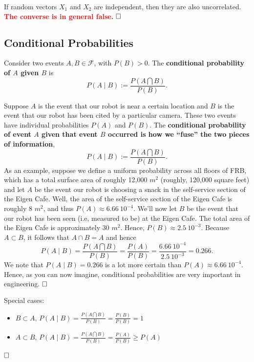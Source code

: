 \begin{fact} If random vectors $X_1$ and $X_2$ are independent, then they are also uncorrelated. \textcolor{red}{\bf The converse is in general false.}
$\hfill \square$
\end{fact} 

\subsection{Conditional Probabilities}

\begin{definition} Consider two events $A,B \in \mathscr{F}$, with $P(B) > 0$. The \textbf{conditional probability of $A$ given $B$} is
        $$P(A \mid B):=\frac{P(A\bigcap B)}{P(B)}.$$
\end{definition} 

\begin{rem} Suppose $A$ is the event that our robot is near a certain location and $B$ is the event that our robot has been cited by a particular camera. These two events have individual probabilities $P(A)$ and $P(B)$. The \textbf{conditional probability of event $A$ given that event $B$ occurred is how we ``fuse'' the two pieces of information},
        $$P(A \mid B):=\frac{P(A\bigcap B)}{P(B)}.$$
As an example, suppose we define a uniform probability across all floors of FRB, which has a total surface area of roughly 12,000 $m^2$ (roughly, 120,000 square feet) and let $A$ be the event our robot is choosing a snack in the self-service section of the Eigen Cafe. Well, the area of the self-service section of the Eigen Cafe is roughly 8 $m^2$, and thus $P(A) \approx 6.66~10^{-4}$. We'll now let $B$ be the event that our robot has been seen (i.e, measured to be) at the Eigen Cafe. The total area of the Eigen Cafe is approximately 30 $m^2$. Hence, $P(B)\approx 2.5~ 10^{-3}$. Because $A \subset B$, it follows that $A \cap B = A$ and hence
    $$P(A \mid B)=\frac{P(A\bigcap B)}{P(B)} = \frac{P(A)}{P(B)}= \frac{6.66~10^{-4}}{2.5~ 10^{-3}}=0.266.$$
    We note that $P(A \mid B)=0.266$ is a lot more certain than $P(A) \approx 6.66~10^{-4}$. Hence, as you can now imagine, conditional probabilities are very important in engineering.
$\hfill \square$  \end{rem}

\begin{rem} Special cases:
\begin{itemize}
        \item
        $B\subset A \mbox{, } P(A \mid B)=\frac{P(A\bigcap B)}{P(B)}=\frac{P(B)}{P(B)}=1$
        \item
        $A\subset B \mbox{, } P(A \mid B)=\frac{P(A\bigcap B)}{P(B)}=\frac{P(A)}{P(B)}\ge P(A)$

        \end{itemize}
        
$\hfill \square$  \end{rem}
   
